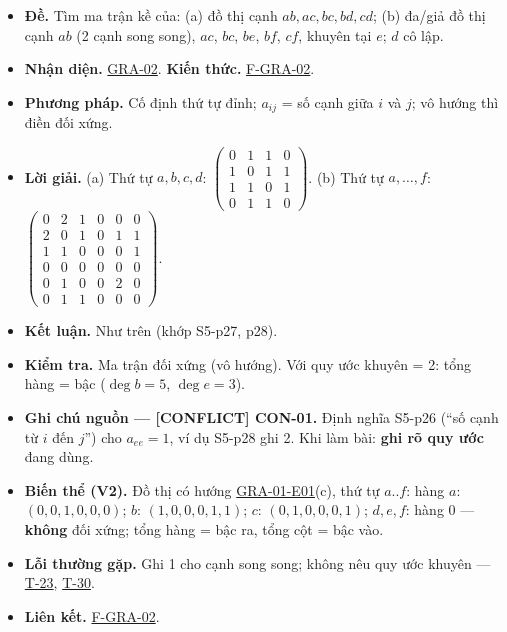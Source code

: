 \documentclass[
  10pt,
  twoside,openany]{book}
\providecommand{\tightlist}{%
  \setlength{\itemsep}{0pt}\setlength{\parskip}{0pt}}
\begin{document}
\begin{itemize}
\tightlist
\item
  \textbf{Đề.} Tìm ma trận kề của: (a) đồ thị cạnh
  \(ab, ac, bc, bd, cd\); (b) đa/giả đồ thị cạnh \(ab\) (2 cạnh song
  song), \(ac\), \(bc\), \(be\), \(bf\), \(cf\), khuyên tại \(e\); \(d\)
  cô lập.
\item
  \textbf{Nhận diện.} \protect\hyperlink{GRA-02}{GRA-02}. \textbf{Kiến
  thức.} \protect\hyperlink{F-GRA-02}{F-GRA-02}.
\item
  \textbf{Phương pháp.} Cố định thứ tự đỉnh; \(a_{ij}\) = số cạnh giữa
  \(i\) và \(j\); vô hướng thì điền đối xứng.
\item
  \textbf{Lời giải.} (a) Thứ tự \(a,b,c,d\):
  \(\begin{pmatrix}0&1&1&0\\1&0&1&1\\1&1&0&1\\0&1&1&0\end{pmatrix}\).
  (b) Thứ tự \(a,\dots,f\):
  \(\begin{pmatrix}0&2&1&0&0&0\\2&0&1&0&1&1\\1&1&0&0&0&1\\0&0&0&0&0&0\\0&1&0&0&2&0\\0&1&1&0&0&0\end{pmatrix}\).
\item
  \textbf{Kết luận.} Như trên (khớp S5-p27, p28).
\item
  \textbf{Kiểm tra.} Ma trận đối xứng (vô hướng). Với quy ước khuyên =
  2: tổng hàng = bậc (\(\deg b=5\), \(\deg e=3\)).
\item
  \textbf{Ghi chú nguồn --- {[}CONFLICT{]} CON-01.} Định nghĩa S5-p26
  (``số cạnh từ \(i\) đến \(j\)'') cho \(a_{ee}=1\), ví dụ S5-p28 ghi 2.
  Khi làm bài: \textbf{ghi rõ quy ước} đang dùng.
\item
  \textbf{Biến thể (V2).} Đồ thị có hướng
  \protect\hyperlink{GRA-01-E01}{GRA-01-E01}(c), thứ tự \(a..f\): hàng
  \(a\): \((0,0,1,0,0,0)\); \(b\): \((1,0,0,0,1,1)\); \(c\):
  \((0,1,0,0,0,1)\); \(d,e,f\): hàng 0 --- \textbf{không} đối xứng; tổng
  hàng = bậc ra, tổng cột = bậc vào.
\item
  \textbf{Lỗi thường gặp.} Ghi 1 cho cạnh song song; không nêu quy ước
  khuyên --- \protect\hyperlink{T-23}{T-23},
  \protect\hyperlink{T-30}{T-30}.
\item
  \textbf{Liên kết.} \protect\hyperlink{F-GRA-02}{F-GRA-02}.
\end{itemize}
\end{document}
